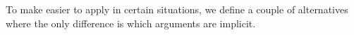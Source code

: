 \begin{code}
\AgdaSpace{}%
\AgdaSpace{}%
\AgdaSymbol{)}\AgdaSpace{}%
%
\>[44]\AgdaSpace{}%
\AgdaSpace{}%
\AgdaSpace{}%
\<%
\\
%
\>[7]\AgdaSpace{}%
\AgdaSpace{}%
\AgdaSpace{}%
\AgdaSpace{}%
%
\>[42]\<%
\\
%
\\[\AgdaEmptyExtraSkip]%
%
\>[1]\AgdaSpace{}%
\AgdaSymbol{:}\AgdaSpace{}%
\AgdaSpace{}%
\AgdaSpace{}%
\AgdaSpace{}%
\AgdaSpace{}%
\AgdaSpace{}%
\AgdaSpace{}%
\AgdaSpace{}%
\AgdaSpace{}%
\AgdaSpace{}%
\AgdaSpace{}%
\AgdaSpace{}%
\<%
\\
%
\>[1]\AgdaSpace{}%
\AgdaSpace{}%
\AgdaSymbol{=}\AgdaSpace{}%
\AgdaSymbol{(}\AgdaSpace{}%
\AgdaSpace{}%
\AgdaSpace{}%
\AgdaSpace{}%
\AgdaSymbol{(}\AgdaSpace{}%
\AgdaSymbol{(}\AgdaSpace{}%
\AgdaSpace{}%
\AgdaSpace{}%
\AgdaSymbol{)))}\AgdaSpace{}%
\AgdaSpace{}%
\AgdaSpace{}%
\<%
\end{code}
\ccpad
To make  easier to apply in certain situations, we define a couple of alternatives where the only difference is which arguments are implicit.
\ccpad
